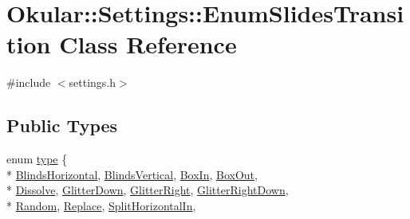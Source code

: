 \hypertarget{classOkular_1_1Settings_1_1EnumSlidesTransition}{\section{Okular\+:\+:Settings\+:\+:Enum\+Slides\+Transition Class Reference}
\label{classOkular_1_1Settings_1_1EnumSlidesTransition}
}


{\ttfamily \#include $<$settings.\+h$>$}

\subsection*{Public Types}
\begin{DoxyCompactItemize}
\item 
enum \hyperlink{classOkular_1_1Settings_1_1EnumSlidesTransition_ae1bec274595e6aac4cdcfc809afb3d63}{type} \{ \\*
\hyperlink{classOkular_1_1Settings_1_1EnumSlidesTransition_ae1bec274595e6aac4cdcfc809afb3d63ab6acf4c165284f54d5f117b76a3a1ec4}{Blinds\+Horizontal}, 
\hyperlink{classOkular_1_1Settings_1_1EnumSlidesTransition_ae1bec274595e6aac4cdcfc809afb3d63a63fcf5a3a6dd78b79480889df8256111}{Blinds\+Vertical}, 
\hyperlink{classOkular_1_1Settings_1_1EnumSlidesTransition_ae1bec274595e6aac4cdcfc809afb3d63add6c744f708560ab49624db2d06df2e9}{Box\+In}, 
\hyperlink{classOkular_1_1Settings_1_1EnumSlidesTransition_ae1bec274595e6aac4cdcfc809afb3d63a87c36d5ce2b8153a93d3d3baf7a1ab49}{Box\+Out}, 
\\*
\hyperlink{classOkular_1_1Settings_1_1EnumSlidesTransition_ae1bec274595e6aac4cdcfc809afb3d63a08fbbfd98c9ece8fe56455ffd01a6d01}{Dissolve}, 
\hyperlink{classOkular_1_1Settings_1_1EnumSlidesTransition_ae1bec274595e6aac4cdcfc809afb3d63a91c8ff11b2281e5424a39b24e053eaf0}{Glitter\+Down}, 
\hyperlink{classOkular_1_1Settings_1_1EnumSlidesTransition_ae1bec274595e6aac4cdcfc809afb3d63a37c4a10c6b50711c5c9208a15c6756e1}{Glitter\+Right}, 
\hyperlink{classOkular_1_1Settings_1_1EnumSlidesTransition_ae1bec274595e6aac4cdcfc809afb3d63a8718b5b02d8d59af7e7e5809c107f4fe}{Glitter\+Right\+Down}, 
\\*
\hyperlink{classOkular_1_1Settings_1_1EnumSlidesTransition_ae1bec274595e6aac4cdcfc809afb3d63a5b4a4d44d6e00b627e71549ef542f962}{Random}, 
\hyperlink{classOkular_1_1Settings_1_1EnumSlidesTransition_ae1bec274595e6aac4cdcfc809afb3d63a3cb2b7a46abd95b4426a08787155d9c9}{Replace}, 
\hyperlink{classOkular_1_1Settings_1_1EnumSlidesTransition_ae1bec274595e6aac4cdcfc809afb3d63a80eae0a6d6183a94ef9b18f513fcf507}{Split\+Horizontal\+In}, 

\end{DoxyCompactItemize}
